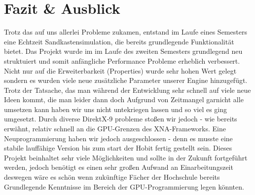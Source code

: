 \chapter{Fazit \& Ausblick}

\begin{Spacing}{\mylinespace}
Trotz das auf uns allerlei Probleme zukamen, entstand im Laufe eines Semesters eine Echtzeit Sandkastensimulation, die bereits grundlegende Funktionalität bietet. 
Das Projekt wurde im  im Laufe des zweiten Semesters grundlegend neu struktuiert und somit anfängliche Performance Probleme erheblich verbessert.
Nicht nur auf die Erweiterbarkeit (Properties) wurde sehr hohen Wert gelegt sondern es wurden viele neue zusätzliche Parameter unserer Engine hinzugefügt.
Trotz der Tatsache, das man während der Entwicklung sehr schnell auf viele neue Ideen kommt, die man leider dann doch Aufgrund von Zeitmangel garnicht alle umsetzen kann haben wir uns nicht untekriegen lassen und so viel es ging umgesetzt. Durch diverse DirektX-9 probleme stoßen wir jedoch - wie bereits erwähnt, relativ schnell an die GPU-Grenzen des XNA-Frameworks.
Eine Neuprogrammierung haben wir jedoch ausgeschlossen - denn es musste eine stabile lauffähige Version bis zum start der Hobit fertig gestellt sein.
Dieses Projekt beinhaltet sehr viele Möglichkeiten und sollte in der Zukunft fortgeführt werden, jedoch benötigt es einen sehr großen Aufwand an Einarbeitungszeit deswegen wäre es schön wenn zukünftige Fächer der Hochschule bereits Grundlegende Kenntnisse im Bereich der GPU-Programmierung legen könnten.
	
\end{Spacing}
\newpage
\clearpage
